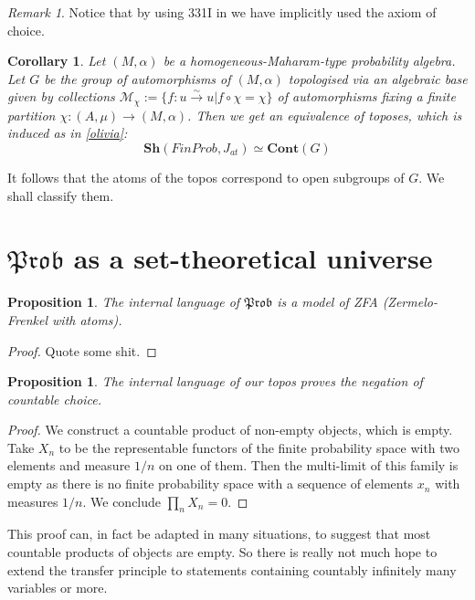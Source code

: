 \documentclass[a4paper]{amsproc}
\theoremstyle{plain}
\newtheorem{proposition}[theorem]{Proposition}
\newtheorem{corollary}[theorem]{Corollary}
\theoremstyle{definition}
\theoremstyle{remark}
\newtheorem{remark}[theorem]{Remark}
\numberwithin{equation}{section}
\begin{document}
\begin{remark}
Notice that by using 331I in \cite{fremlin} we have implicitly used the axiom of choice.
\end{remark}

\begin{corollary} Let $(M, \alpha)$ be a homogeneous-Maharam-type probability algebra. Let $G$ be the group of automorphisms of $(M, \alpha)$ topologised via an algebraic base given by collections $\mathcal{M}_{\chi}:=\{f:u\overset{\sim}{\rightarrow} u| f\circ \chi=\chi\} $ of automorphisms fixing a finite partition $\chi: (A,\mu)\rightarrow (M, \alpha)$. Then we get an equivalence of toposes, which is induced as in \ref{olivia}:
\[\textbf{Sh}(FinProb, J_{at})\simeq \textbf{Cont}(G)\]
\end{corollary}
It follows that the atoms of the topos correspond to open subgroups of $G$. We shall classify them. %


\section{$\mathfrak{Prob}$ as a set-theoretical universe}

\begin{proposition} The internal language of $\mathfrak{Prob}$ is a model of ZFA (Zermelo-Frenkel with atoms).
\end{proposition}
\begin{proof} Quote some shit.
\end{proof}

\begin{proposition} The internal language of our topos proves the negation of countable choice.
\end{proposition}
\begin{proof} We construct a countable product of non-empty objects, which is empty. Take $X_n$ to be the representable functors of the finite probability space with two elements and measure $1/n$ on one of them. Then the multi-limit of this family is empty as there is no finite probability space with a sequence of elements $x_n$ with measures $1/n$. We conclude $\prod_n X_n=0$.
\end{proof}

This proof can, in fact be adapted in many situations, to suggest that most countable products of objects are empty. So there is really not much hope to extend the transfer principle to statements containing countably infinitely many variables or more.
\end{document}
